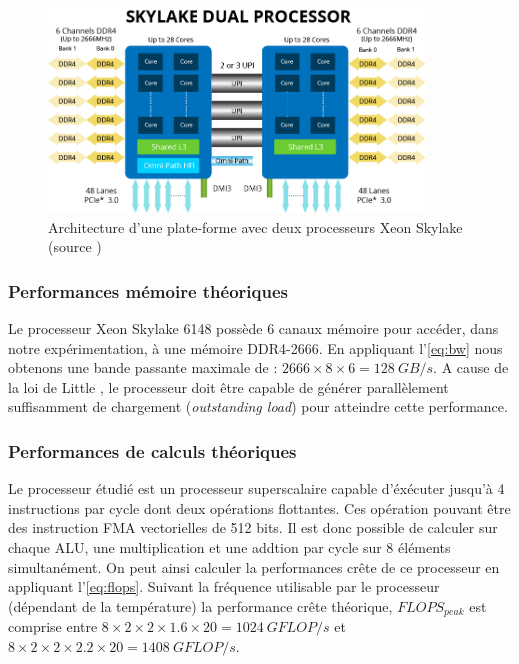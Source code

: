 \begin{figure}
    \center
    \includegraphics[width=10cm]{images/skylake_gold.png}
    \caption{\label{skylake_gold} Architecture d'une plate-forme avec deux processeurs Xeon Skylake (source \cite{Aspsys})}
\end{figure}



\subsubsection{Performances mémoire théoriques}
Le processeur Xeon Skylake 6148 possède 6 canaux mémoire pour accéder, dans notre expérimentation, à une mémoire DDR4-2666. En appliquant l'\autoref{eq:bw} nous obtenons une bande passante maximale de : $2666 \times 8 \times 6 = 128\ GB/s$. A cause de la loi de Little \cite{little2008little}, le processeur doit être capable de générer parallèlement suffisamment de chargement (\textit{outstanding load}) pour atteindre cette performance.


\subsubsection{Performances de calculs théoriques}
Le processeur étudié est un processeur superscalaire capable d'éxécuter jusqu'à 4 instructions par cycle dont deux opérations flottantes. Ces opération pouvant être des instruction FMA vectorielles de 512 bits. Il est donc possible de calculer sur chaque ALU, une multiplication et une addtion par cycle sur 8 éléments simultanément. On peut ainsi calculer la performances crête de ce processeur en appliquant l'\autoref{eq:flops}. Suivant la fréquence utilisable par le processeur (dépendant de la température) la performance crête théorique, $FLOPS_{peak}$ est comprise entre $8 \times 2 \times 2 \times 1.6 \times 20 = 1024\ GFLOP/s$ et  $8 \times 2 \times 2 \times 2.2 \times 20 = 1408\ GFLOP/s$. 

